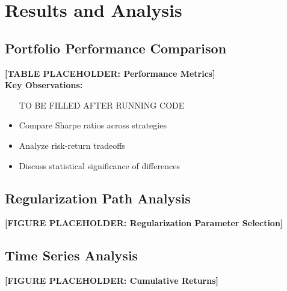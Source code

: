 \documentclass[12pt]{article}
\begin{document}
\section{Results and Analysis}

\subsection{Portfolio Performance Comparison}
\textbf{[TABLE PLACEHOLDER: Performance Metrics]}
\\

\textbf{Key Observations:}
\begin{itemize}
    \item [TO BE FILLED AFTER RUNNING CODE]
    \item Compare Sharpe ratios across strategies
    \item Analyze risk-return tradeoffs
    \item Discuss statistical significance of differences
\end{itemize}

\subsection{Regularization Path Analysis}
\textbf{[FIGURE PLACEHOLDER: Regularization Parameter Selection]}
\\

\subsection{Time Series Analysis}
\textbf{[FIGURE PLACEHOLDER: Cumulative Returns]}
\\
\end{document}
